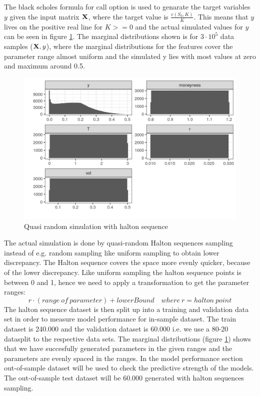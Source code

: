 The black scholes formula for call option is used to genarate the target variables $y$ given the input matrix $\mathbf{X}$, where the target value is $\frac{c(S_0,K)}{K}$. This means that $y$ lives on the positive real line for $K>=0$ and the actual simulated values for $y$ can be seen in figure \ref{fig:marginalEuro}. The marginal distributions shown is for $3\cdot 10^{5}$ data samples ($\mathbf{X},y$), where the marginal distributions for the features cover the parameter range almost uniform and the simulated y lies with most values at zero and maximum around 0.5. 

\begin{figure}[H]
\centering
\includegraphics{Figures/marginalEuroCall.png}
\decoRule
\caption[Marginal distributions for european call]{Quasi random simulation with halton sequence}
\label{fig:marginalEuro}
\end{figure}


The actual simulation is done by quasi-random Halton sequences sampling instead of e.g. random sampling like uniform sampling to obtain lower discrepancy. The Halton sequence covers the space more evenly quicker, because of the lower discrepancy. Like uniform sampling the halton sequence points is between 0 and 1, hence we need to apply a transformation to get the parameter ranges:
$$r \cdot (range \ of \ parameter) + lowerBound \quad where \ r=halton \ point$$
The halton sequence dataset is then split up into a training and validation data set in order to measure model performance for in-sample dataset. The train dataset is 240.000 and the validation dataset is 60.000 i.e. we use a 80-20 datasplit to the respective data sets. The marginal distributions (figure \ref{fig:marginalEuro}) shows that we have succesfully generated parameters in the given ranges and the parameters are evenly spaced in the ranges. In the model performance section out-of-sample dataset will be used to check the predictive strength of the models. The out-of-sample test dataset will be 60.000 generated with halton sequences sampling.

